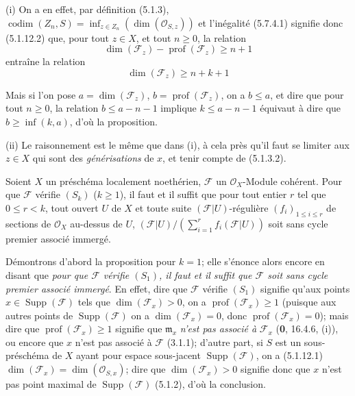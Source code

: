 (i) On a en effet, par définition (5.1.3),
$\operatorname{codim}(Z_n,S)=\inf_{z\in Z_n}(\dim(\mathcal O_{S,z}))$ et
l'inégalité (5.7.4.1) signifie donc (5.1.12.2) que, pour tout $z\in X$, et
tout $n\geq0$, la relation
\[
\dim(\mathscr F_z)-\operatorname{prof}(\mathscr F_z)\geq n+1
\]
entraîne la relation
\[
\dim(\mathscr F_z)\geq n+k+1
\]

Mais si l'on pose $a=\dim(\mathscr F_z)$,
$b=\operatorname{prof}(\mathscr F_z)$, on a $b\leq a$, et dire que pour tout
$n\geq0$, la relation $b\leq a-n-1$ implique $k\leq a-n-1$ équivaut à dire
que $b\geq\inf(k,a)$, d'où la proposition.


(ii) Le raisonnement est le même que dans (i), à cela près qu'il faut se
limiter aux $z\in X$ qui sont des \emph{générisations} de $x$, et tenir compte de
(5.1.3.2).

\begin{proposition}[5.7.5]
\label{IV.2.s5.7.5-fr}
Soient $X$ un préschéma localement noethérien, $\mathscr F$ un
$\mathcal O_X$-Module cohérent. Pour que $\mathscr F$ vérifie $(S_k)$
($k\geq1$), il faut et il suffit que pour tout entier $r$ tel que
$0\leq r<k$, tout ouvert $U$ de $X$ et toute suite
$(\mathscr F|U)$-régulière $(f_i)_{1\leq i\leq r}$ de sections de
$\mathcal O_X$ au-dessus de $U$,
$(\mathscr F|U)/(\sum_{i=1}^r f_i(\mathscr F|U))$
soit sans cycle premier associé immergé.
\end{proposition}

Démontrons d'abord la proposition pour $k=1$; elle s'énonce alors encore en
disant que \emph{pour que $\mathscr F$ vérifie $(S_1)$, il faut et il suffit que
$\mathscr F$ soit sans cycle premier associé immergé}. En effet, dire que
$\mathscr F$ vérifie $(S_1)$ signifie qu'aux points
$x\in\operatorname{Supp}(\mathscr F)$ tels que $\dim(\mathscr F_x)>0$, on a
$\operatorname{prof}(\mathscr F_x)\geq1$ (puisque aux autres points de
$\operatorname{Supp}(\mathscr F)$ on a $\dim(\mathscr F_x)=0$, donc
$\operatorname{prof}(\mathscr F_x)=0$); mais dire que
$\operatorname{prof}(\mathscr F_x)\geq1$ signifie que $\mathfrak m_x$
\emph{n'est pas associé à} $\mathscr F_x$ (\textbf{0}, 16.4.6, (i)), ou encore que $x$
n'est pas associé à $\mathscr F$ (3.1.1); d'autre part, si $S$ est un
sous-préschéma de $X$ ayant pour espace sous-jacent
$\operatorname{Supp}(\mathscr F)$, on a (5.1.12.1)
$\dim(\mathscr F_x)=\dim(\mathcal O_{S,x})$; dire que
$\dim(\mathscr F_x)>0$ signifie donc que $x$ n'est pas point maximal de
$\operatorname{Supp}(\mathscr F)$ (5.1.2), d'où la conclusion.

